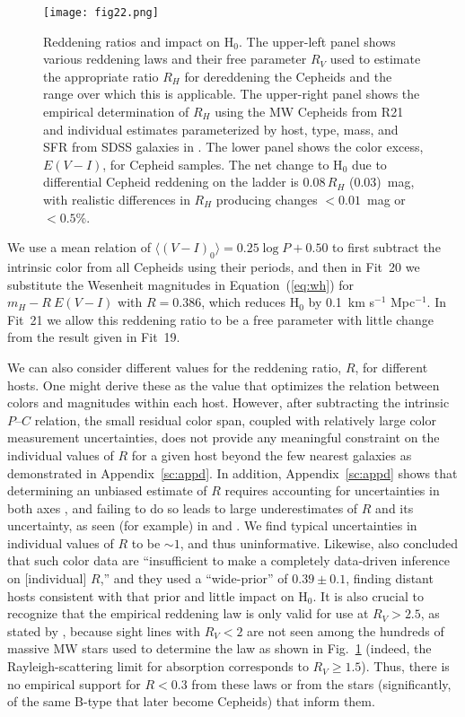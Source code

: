 \documentclass[12pt]{aastex631}
\newcommand{\kms}{km s$^{-1}$ Mpc$^{-1}$}
\begin{document}
\begin{figure}[b]  
\begin{center}
\texttt{[image: fig22.png]}
\end{center}
\caption{\label{fg:rh} Reddening ratios and impact on H$_0$. The upper-left panel shows various reddening laws and their free parameter $R_V$ used to estimate the appropriate ratio $R_H$ for dereddening the Cepheids and the range over which this is applicable. The upper-right panel shows the empirical determination of $R_H$ using the MW Cepheids from R21 and individual estimates parameterized by host, type, mass, and SFR from SDSS galaxies in \citet{Hahn:2021}.  The lower panel shows the color excess, $E(V\!-\!I)$, for Cepheid samples.  The net change to H$_0$ due to differential Cepheid reddening on the ladder is 0.08\,$R_H$ (0.03)~mag, with realistic differences in $R_H$ producing changes $ < 0.01$~mag or  $< 0.5$\%.}
\end{figure}

We use a mean relation of $\langle(V\!-\!I)_0\rangle=0.25\log P+0.50$ to first subtract the intrinsic color from all Cepheids using their periods, and then in Fit~20 we substitute the Wesenheit magnitudes in Equation~(\ref{eq:wh}) for $m_H-R\ E({V\!-\!I})$ with $R=0.386$, which reduces H$_0$ by 0.1~\kms. In Fit~21 we allow this reddening ratio to be a free parameter with little change from the result given in Fit~19.
  
We can also consider different values for the reddening ratio, $R$, for different hosts. One might derive these as the value that optimizes the relation between colors and magnitudes within each host.  However, after subtracting the intrinsic $P$--$C$ relation, the small residual color span, coupled with relatively large color measurement uncertainties, does not provide any meaningful constraint on the individual values of $R$ for a given host beyond the few nearest galaxies as demonstrated in Appendix~\ref{sc:appd}.  In addition, Appendix~\ref{sc:appd} shows that determining an unbiased estimate of $R$ requires accounting for uncertainties in both axes \citep[in this case color and brightness with the statistical issue discussed by][]{Tremaine:2002}, and failing to do so leads to large underestimates of $R$ and its uncertainty, as seen (for example) in \citet{Peri:2021} and \citet{Mortsell:2021}.  We find typical uncertainties in individual values of $R$ to be $\sim 1$, and thus uninformative. Likewise, \citet{Follin:2017} also concluded that such color data are ``insufficient to make a completely data-driven inference on [individual] $R$,'' and they used a ``wide-prior'' of $0.39\pm 0.1$, finding distant hosts consistent with that prior and little impact on H$_0$. It is also crucial to recognize that the empirical reddening law is only valid for use at $R_V > 2.5$, as stated by \citet{Fitzpatrick:2019}, because sight lines with $R_V<2$ are not seen among the hundreds of massive MW stars used to determine the law as shown in Fig.~\ref{fg:rh} (indeed, the Rayleigh-scattering limit for absorption corresponds to $R_V \geq 1.5$).   Thus, there is no empirical support for $R<0.3$ from these laws or from the stars (significantly, of the same B-type that later become Cepheids) that inform them.  
\end{document}
